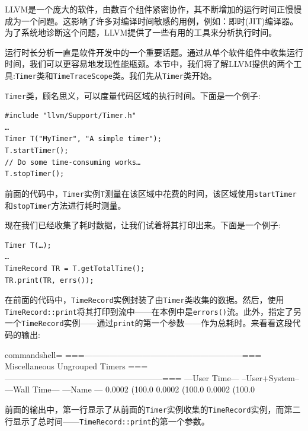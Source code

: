 
LLVM是一个庞大的软件，由数百个组件紧密协作，其不断增加的运行时间正慢慢成为一个问题。这影响了许多对编译时间敏感的用例，例如：即时(JIT)编译器。为了系统地诊断这个问题，LLVM提供了一些有用的工具来分析执行时间。

运行时长分析一直是软件开发中的一个重要话题。通过从单个软件组件中收集运行时间，我们可以更容易地发现性能瓶颈。本节中，我们将了解LLVM提供的两个工具:\texttt{Timer}类和\texttt{TimeTraceScope}类。我们先从\texttt{Timer}类开始。


\texttt{Timer}类，顾名思义，可以度量代码区域的执行时间。下面是一个例子:

\begin{lstlisting}[style=styleCXX]
#include "llvm/Support/Timer.h"
…
Timer T("MyTimer", "A simple timer");
T.startTimer();
// Do some time-consuming works…
T.stopTimer();
\end{lstlisting}

前面的代码中，\texttt{Timer}实例\texttt{T}测量在该区域中花费的时间，该区域使用\texttt{startTimer}和\texttt{stopTimer}方法进行耗时测量。

现在我们已经收集了耗时数据，让我们试着将其打印出来。下面是一个例子:

\begin{lstlisting}[style=styleCXX]
Timer T(…);
…
TimeRecord TR = T.getTotalTime();
TR.print(TR, errs());
\end{lstlisting}

在前面的代码中，\texttt{TimeRecord}实例封装了由\texttt{Timer}类收集的数据。然后，使用\texttt{TimeRecord::print}将其打印到流中——在本例中是\texttt{errors()}流。此外，指定了另一个\texttt{TimeRecord}实例——通过\texttt{print}的第一个参数——作为总耗时。来看看这段代码的输出:

\begin{tcblisting}{commandshell={}}
===---------------------------------------------------------===
                Miscellaneous Ungrouped Timers
===---------------------------------------------------------===
---User Time--- --User+System-- ---Wall Time--- ---Name ---
 0.0002 (100.0%
 0.0002 (100.0%
 0.0002 (100.0%
\end{tcblisting}

前面的输出中，第一行显示了从前面的\texttt{Timer}实例收集的\texttt{TimeRecord}实例，而第二行显示了总时间——\texttt{TimeRecord::print}的第一个参数。

